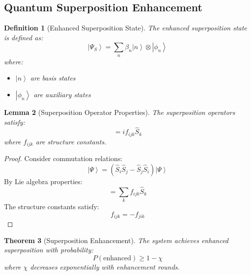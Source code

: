 \documentclass[12pt]{article}
\newcommand{\ket}[1]{\left|#1\right\rangle}
\newcommand{\op}[1]{\hat{#1}}
\newtheorem{theorem}{Theorem}[section]
\newtheorem{lemma}[theorem]{Lemma}
\newtheorem{definition}[theorem]{Definition}
\begin{document}
\subsection{Quantum Superposition Enhancement}
\begin{definition}[Enhanced Superposition State]
The enhanced superposition state is defined as:
\begin{equation}
\ket{\Psi_S} = \sum_n \beta_n\ket{n} \otimes \ket{\phi_n}
\end{equation}
where:
\begin{itemize}
\item $\ket{n}$ are basis states
\item $\ket{\phi_n}$ are auxiliary states
\end{itemize}
\end{definition}
\begin{lemma}[Superposition Operator Properties]
The superposition operators satisfy:
\begin{equation}
[\op{S}_i,\op{S}_j] = if_{ijk}\op{S}_k
\end{equation}
where $f_{ijk}$ are structure constants.
\end{lemma}
\begin{proof}
Consider commutation relations:
\begin{equation}
[\op{S}_i,\op{S}_j]\ket{\Psi} = (\op{S}_i\op{S}_j - \op{S}_j\op{S}_i)\ket{\Psi}
\end{equation}
By Lie algebra properties:
\begin{equation}
[\op{S}_i,\op{S}_j] = \sum_k f_{ijk}\op{S}_k
\end{equation}
The structure constants satisfy:
\begin{equation}
f_{ijk} = -f_{jik}
\end{equation}
\end{proof}
\begin{theorem}[Superposition Enhancement]
The system achieves enhanced superposition with probability:
\begin{equation}
P(\text{enhanced}) \geq 1 - \chi
\end{equation}
where $\chi$ decreases exponentially with enhancement rounds.
\end{theorem}
\end{document}
